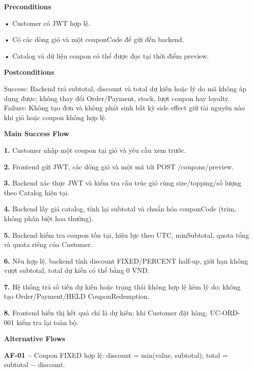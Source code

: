 \documentclass[11pt,a4paper,oneside]{report}
\begin{document}
\par\smallskip\noindent\textcolor{sgublue}{\textbf{Preconditions}}\par\nobreak
\textbf{•} Customer có JWT hợp lệ.

\textbf{•} Có các dòng giỏ và một couponCode để gửi đến backend.

\textbf{•} Catalog và dữ liệu coupon có thể được đọc tại thời điểm preview.
\par

\par\smallskip\noindent\textcolor{sgublue}{\textbf{Postconditions}}\par\nobreak
Success: Backend trả subtotal, discount và total dự kiến hoặc lý do mã không áp dụng được; không thay đổi Order/Payment, stock, lượt coupon hay loyalty.\\
Failure: Không tạo đơn và không phát sinh bất kỳ side effect giữ tài nguyên nào khi giỏ hoặc coupon không hợp lệ.\strut
\par

\par\smallskip\noindent\textcolor{sgublue}{\textbf{Main Success Flow}}\par\nobreak
\textbf{1.} Customer nhập một coupon tại giỏ và yêu cầu xem trước.

\textbf{2.} Frontend gửi JWT, các dòng giỏ và một mã tới POST /coupons/preview.

\textbf{3.} Backend xác thực JWT và kiểm tra cấu trúc giỏ cùng size/topping/số lượng theo Catalog hiện tại.

\textbf{4.} Backend lấy giá catalog, tính lại subtotal và chuẩn hóa couponCode (trim, không phân biệt hoa thường).

\textbf{5.} Backend kiểm tra coupon tồn tại, hiệu lực theo UTC, minSubtotal, quota tổng và quota riêng của Customer.

\textbf{6.} Nếu hợp lệ, backend tính discount FIXED/PERCENT half-up, giới hạn không vượt subtotal, total dự kiến có thể bằng 0 VND.

\textbf{7.} Hệ thống trả số tiền dự kiến hoặc trạng thái không hợp lệ kèm lý do; không tạo Order/Payment/HELD CouponRedemption.

\textbf{8.} Frontend hiển thị kết quả chỉ là dự kiến; khi Customer đặt hàng, UC-ORD-001 kiểm tra lại toàn bộ.
\par

\par\smallskip\noindent\textcolor{sgublue}{\textbf{Alternative Flows}}\par\nobreak
\textbf{AF-01 --} Coupon FIXED hợp lệ: discount = min(value, subtotal); total = subtotal − discount.
\end{document}
